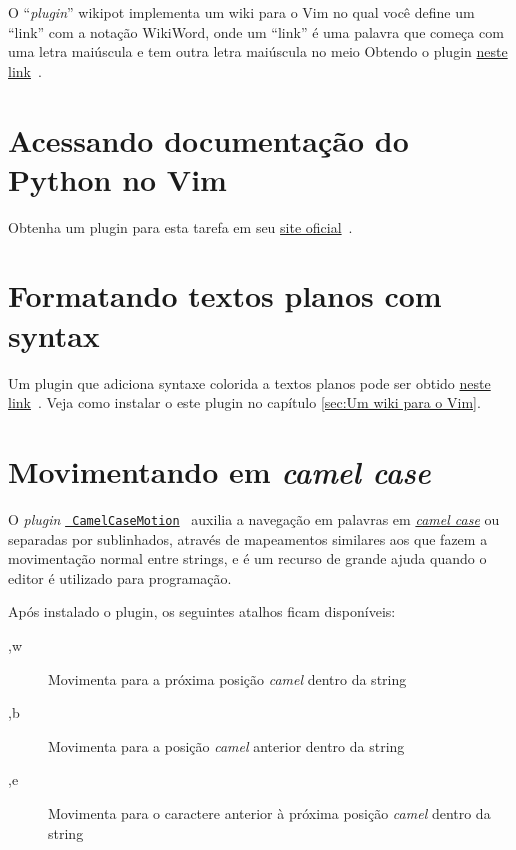 O ``{\em plugin}'' wikipot implementa um wiki para o Vim no qual você define um
``link'' com a notação WikiWord, onde um ``link'' é uma palavra que começa com
uma letra maiúscula e tem outra letra maiúscula no meio Obtendo o plugin
\href{http://www.vim.org/scripts/script.php?script\_id=1018}{neste
link}~\cite{PluginPotWiki}.

\section{Acessando documentação do Python no Vim}\label{Acessando documentação do Python no Vim}
 Obtenha um plugin para esta tarefa em seu 
 \href{http://www.vim.org/scripts/script.php?script\_id=910}{site oficial}~\cite{PluginDocPython}.

\section{Formatando textos planos com syntax}\label{Formatando textos planos com syntax}

Um plugin que adiciona syntaxe colorida a textos planos pode ser obtido
\href{http://www.vim.org/scripts/script.php?script\_id=2208&rating=helpful#1.3}{neste
link}~\cite{PluginTextoPlano}.  Veja como instalar o este plugin no capítulo
\ref{sec:Um wiki para o Vim}.

\section{Movimentando em {\em camel case}}\label{Movimentando em camel case}
O {\em plugin} \href{http://www.vim.org/scripts/script.php?script\_id=1905}{{\tt
CamelCaseMotion}}~\cite{PluginCamelCaseMotion} auxilia a navegação em palavras em
\href{http://en.wikipedia.org/wiki/Camel\_case}{{\em camel case}} ou separadas
por sublinhados, através de mapeamentos similares aos que fazem a movimentação
normal entre strings, e é um recurso de grande ajuda quando o editor é
utilizado para programação. 

Após instalado o plugin, os seguintes atalhos ficam disponíveis:
\begin{description}
 \item [,w] Movimenta para a próxima posição {\em camel} dentro da string
 \item [,b] Movimenta para a posição {\em camel} anterior dentro da string
 \item [,e] Movimenta para o caractere anterior à próxima posição {\em camel} dentro da string
\end{description}

